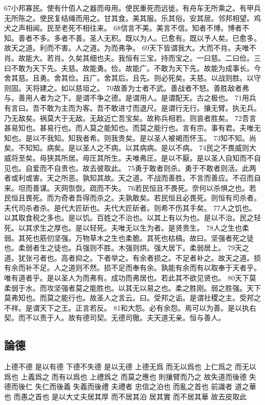 \documentclass[a5paper,zihao=-4,oneside,UTF8]{ctexart}
\begin{document}
67小邦寡民。使有什佰人之器而毋用。使民重死而远徙。有舟车无所乘之。有甲兵无所陈之。使民复结绳而用之。甘其食。美其服。乐其俗。安其居。邻邦相望。鸡犬之声相闻。民至老死不相往来。
68信言不美。美言不信。知者不博。博者不知。善者不多。多者不善。圣人无积。既以为人。已愈有。既以予人矣。已愈多。故天之道。利而不害。人之道。为而弗争。
69天下皆谓我大。大而不肖。夫唯不肖。故能大。若肖。久矣其细也夫。我恒有三宝。持而宝之。一曰慈。二曰俭。三曰不敢为天下先。夫慈。故能勇。俭。故能广。不敢为天下先。故能为成事长。今舍其慈。且勇。舍其俭。且广。舍其后。且先。则必死矣。夫慈。以战则胜。以守则固。天将建之。如以慈垣之。
70故善为士者不武。善战者不怒。善胜敌者弗与。善用人者为之下。是谓不争之德。是谓用人。是谓配天。古之极也。
71用兵有言曰。吾不敢为主而为客。吾不敢进寸而退尺。是谓行无行。攘无臂。执无兵。乃无敌矣。祸莫大于无敌。无敌近亡吾宝矣。故称兵相若。则哀者胜矣。
72吾言甚易知也。甚易行也。而人莫之能知也。而莫之能行也。言有宗。事有君。夫唯无知也。是以不我知。知我者希。则我贵矣。是以圣人被褐而怀玉。
73知不知。尚矣。不知知。病矣。是以圣人之不病。以其病病。是以不病。
74民之不畏威则大威将至矣。毋狭其所居。毋圧其所生。夫唯弗圧。是以不厭。是以圣人自知而不自见也。自爱而不自贵也。故去彼取此。
75勇于敢者则杀。勇于不敢者则活。此两者或利或害。天之所恶。孰知其故。天之道。不战而善胜。不言而善应。不召而自来。坦而善谋。天网恢恢。疏而不失。
76若民恒且不畏死。奈何以杀惧之也。若民恒且畏死。而为奇者吾得而杀之。夫孰敢矣。若民恒且必畏死。则恒有司杀者。夫代司杀者杀。是代大匠斫也。夫代大匠斫者。则希不伤其手矣。
77人之饥也。以其取食税之多也。是以饥。百姓之不治也。以其上有以为也。是以不治。民之轻死。以其求生之厚也。是以轻死。夫唯无以生为者。是贤贵生。
78人之生也柔弱。其死也筋仞坚强。万物草木之生也柔脆。其死也枯槁。故曰。坚强者死之徒也。柔弱者生之徒也。兵强则不胜。木强则烘。强大居下。柔弱居上。
79天之道。犹张弓者也。高者抑之。下者举之。有余者损之。不足者补之。故天之道。损有余而补不足。人之道则不然。损不足而奉有余。孰能有余而有以取奉于天者乎。唯有道者乎。是以圣人为而弗有。成功而弗居也。若此其不欲见贤也。
80天下莫柔弱于水。而攻坚强者莫之能胜也。以其无以易之也。柔之胜刚。弱之胜强。天下莫弗知也。而莫之能行也。故圣人之言云。曰。受邦之诟。是谓社稷之主。受邦之不祥。是谓天下之王。正言若反。
81和大怨。必有余怨。焉可以为善。是以执右契。而不以责于人。故有德司契。无德司徹。夫天道无亲。恒与善人。
 
\subsection{論德}



上德不德 是以有德 下德不失德 是以无德 
上德无爲 而无以爲也 上仁爲之 而无以爲也 上義爲之 而有以爲也 上禮爲之 而莫之應也 則攘臂而乃之 
故失道而後德 失德而後仁 失仁而後義 失義而後禮 夫禮者 忠信之泊也 而亂之首也 
前識者 道之華也 而愚之首也 
是以大丈夫居其厚 而不居其泊 居其實 而不居其華 故去皮取此 
\end{document}
